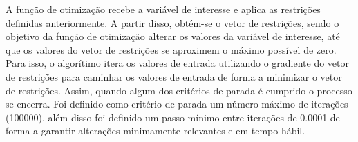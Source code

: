 A função de otimização recebe a variável de interesse e aplica as restrições definidas anteriormente. A partir disso, obtém-se o vetor de restrições, sendo o objetivo da função de otimização alterar os valores da variável de interesse, até que os valores do vetor de restrições se aproximem o máximo possível de zero. Para isso, o algorítimo itera os valores de entrada utilizando o gradiente do vetor de restrições para caminhar os valores de entrada de forma a minimizar o vetor de restrições. Assim, quando algum dos critérios de parada é cumprido o processo se encerra. Foi definido como critério de parada um número máximo de iterações (100000), além disso foi definido um passo mínimo entre iterações de 0.0001 de forma a garantir alterações minimamente relevantes e em tempo hábil.